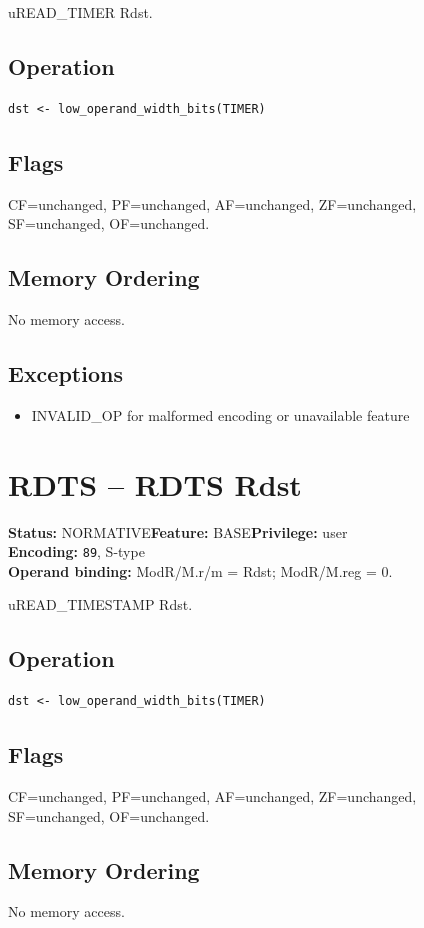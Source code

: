 \documentclass[10pt]{article}
\begin{document}
uREAD\_TIMER Rdst.

\subsection*{Operation}
\begin{lstlisting}
dst <- low_operand_width_bits(TIMER)
\end{lstlisting}
\subsection*{Flags}
CF=unchanged, PF=unchanged, AF=unchanged, ZF=unchanged, SF=unchanged, OF=unchanged.
\subsection*{Memory Ordering}
No memory access.
\subsection*{Exceptions}
\begin{itemize}
\item INVALID\_OP for malformed encoding or unavailable feature
\end{itemize}
\clearpage

\section{RDTS -- RDTS Rdst}
\textbf{Status:} NORMATIVE\quad \textbf{Feature:} BASE\quad \textbf{Privilege:} user\\
\textbf{Encoding:} \texttt{89}, S-type\\
\textbf{Operand binding:} ModR/M.r/m = Rdst; ModR/M.reg = 0.

uREAD\_TIMESTAMP Rdst.

\subsection*{Operation}
\begin{lstlisting}
dst <- low_operand_width_bits(TIMER)
\end{lstlisting}
\subsection*{Flags}
CF=unchanged, PF=unchanged, AF=unchanged, ZF=unchanged, SF=unchanged, OF=unchanged.
\subsection*{Memory Ordering}
No memory access.
\end{document}
